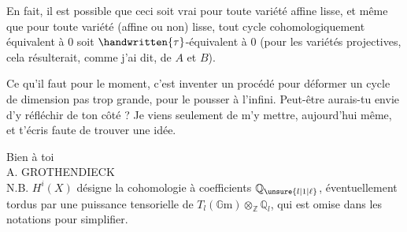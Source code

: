 En fait, il est possible que ceci soit vrai pour toute variété affine lisse, et même que pour toute variété (affine ou non) lisse, tout cycle cohomologiquement équivalent à $0$ soit $\handwritten{\tau}$-équivalent à $0$ (pour les variétés projectives, cela résulterait, comme j'ai dit, de $A$ et $B$).

Ce qu'il faut pour le moment, c'est inventer un procédé pour déformer un cycle de dimension pas trop grande, pour le pousser à l'infini. Peut-être aurais-tu envie d'y réfléchir de ton côté ? Je viens seulement de m'y mettre, aujourd'hui même, et t'écris faute de trouver une idée.

Bien à toi\\
\hfill A. GROTHENDIECK\\

N.B. $H^i(X)$ désigne la cohomologie à coefficients $\mathbb{Q}_{\unsure{l|1|\ell}}$, éventuellement tordus par une puissance tensorielle de $T_l(\mathbb{G}\mathrm{m})\otimes_{\mathbb{Z}}\mathbb{Q}_l$, qui est omise dans les notations pour simplifier.
